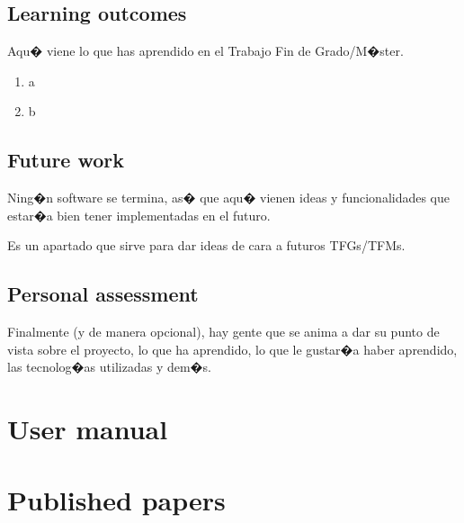 \documentclass[a4paper, 12pt]{book}
\begin{document}
\section{Learning outcomes}
\label{sec:lecciones_aprendidas}

Aqu� viene lo que has aprendido en el Trabajo Fin de Grado/M�ster.

\begin{enumerate}
  \item a
  \item b
\end{enumerate}


\section{Future work}
\label{sec:trabajos_futuros}

Ning�n software se termina, as� que aqu� vienen ideas y funcionalidades
que estar�a bien tener implementadas en el futuro.

Es un apartado que sirve para dar ideas de cara a futuros TFGs/TFMs.


\section{Personal assessment}
\label{sec:valoracion}

Finalmente (y de manera opcional), hay gente que se anima a dar su punto de
vista sobre el proyecto, lo que ha aprendido, lo que le gustar�a haber aprendido,
las tecnolog�as utilizadas y dem�s.




\cleardoublepage
\appendix
\chapter{User manual}
\label{app:manual}

\chapter{Published papers}
\label{app:papers}
\end{document}
